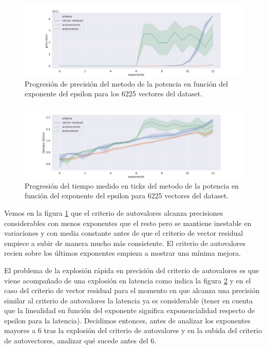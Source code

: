 \begin{figure}[h]
\includegraphics[width=\textwidth]{./img/precision_grande_full.png}
\centering
\caption{Progresión de precisión del metodo de la potencia en función del exponente del epsilon para los 6225 vectores del dataset.\label{fig:pm_g_p}}
\end{figure}

\begin{figure}[h]
\includegraphics[width=\textwidth]{./img/tiempo_grande_full.png}
\centering
\caption{Progresión del tiempo medido en ticks del metodo de la potencia en función del exponente del epsilon para 6225 vectores del dataset.\label{fig:pm_g_t}}
\end{figure}

Vemos en la figura \ref{fig:pm_g_p} que el criterio de autovalores alcanza precisiones considerables con menos exponentes que el resto pero se mantiene inestable en variaciones y con media constante antes de que el criterio de vector residual empiece a subir de manera mucho más consistente. El criterio de autovalores recien sobre los últimos exponentes empieza a mostrar una mínima mejora.

El problema de la explosión rápida en precisión del criterio de autovalores es que viene acompañado de una explosión en latencia como indica la figura \ref{fig:pm_g_t} y en el caso del criterio de vector residual para el momento en que alcanza una precisión similar al criterio de autovalores la latencia ya es considerable (tener en cuenta que la linealidad en función del exponente significa exponencialidad respecto de epsilon para la latencia). Decidimos entonces, antes de analizar los exponentes mayores a $6$ tras la explosión del criterio de autovalores y en la subida del criterio de autovectores, analizar qué sucede antes del $6$.

